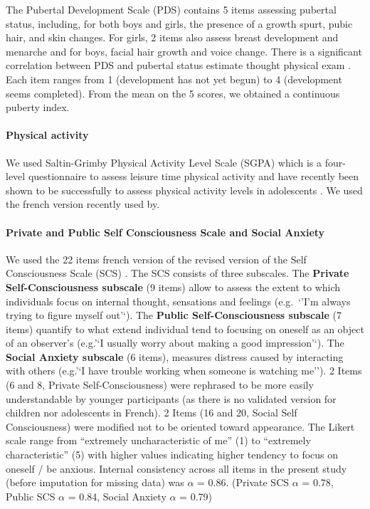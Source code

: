 \documentclass[preprint, 3p,
authoryear]{elsarticle} %
\begin{document}
The Pubertal Development Scale (PDS) \citep{petersen_self-report_1988}
contains 5 items assessing pubertal status, including, for both boys and
girls, the presence of a growth spurt, pubic hair, and skin changes. For
girls, 2 items also assess breast development and menarche and for boys,
facial hair growth and voice change. There is a significant correlation
between PDS and pubertal status estimate thought physical exam
\citep{shirtcliff_pubertal_2009}. Each item ranges from 1 (development
has not yet begun) to 4 (development seems completed). From the mean on
the 5 scores, we obtained a continuous puberty index.

\hypertarget{physical-activity}{%
\paragraph{Physical activity}\label{physical-activity}}

We used Saltin-Grimby Physical Activity Level Scale (SGPA) which is a
four-level questionnaire to assess leisure time physical activity
\citep{grimby_saltin-grimby_2015} and have recently been shown to be
successfully to assess physical activity levels in adolescents
\citep{beldo_criterion_2022}. We used the french version recently used
by\citep{isoard-gautheur_relationships_2023}.

\hypertarget{private-and-public-self-consciousness-scale-and-social-anxiety}{%
\paragraph{Private and Public Self Consciousness Scale and Social
Anxiety}\label{private-and-public-self-consciousness-scale-and-social-anxiety}}

We used the 22 items french version \citep{pelletier_lechelle_1990} of
the revised version \citep{scheier_self-consciousness_1985} of the Self
Consciousness Scale (SCS) \citep{fenigstein_public_1975}. The SCS
consists of three subscales. The \textbf{Private Self-Consciousness
subscale} (9 items) allow to assess the extent to which individuals
focus on internal thought, sensations and feelings (e.g.~`'I'm always
trying to figure myself out'`). The \textbf{Public Self-Consciousness
subscale} (7 items) quantify to what extend individual tend to focusing
on oneself as an object of an observer's (e.g.'`I usually worry about
making a good impression'`). The \textbf{Social Anxiety subscale} (6
items), measures distress caused by interacting with others (e.g.'`I
have trouble working when someone is watching me''). 2 Items (6 and 8,
Private Self-Consciousness) were rephrased to be more easily
understandable by younger participants (as there is no validated version
for children nor adolescents in French). 2 Items (16 and 20, Social Self
Consciousness) were modified not to be oriented toward appearance. The
Likert scale range from ``extremely uncharacteristic of me'' (1) to
``extremely characteristic'' (5) with higher values indicating higher
tendency to focus on oneself / be anxious. Internal consistency across
all items in the present study (before imputation for missing data) was
\(\alpha\) = 0.86. (Private SCS \(\alpha\) = 0.78, Public SCS \(\alpha\)
= 0.84, Social Anxiety \(\alpha\) = 0.79)
\end{document}
